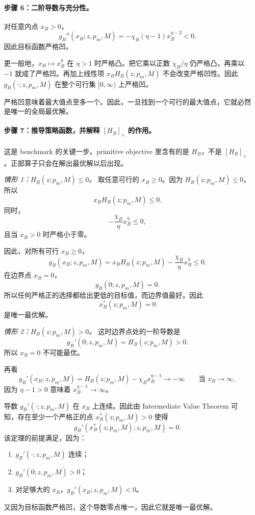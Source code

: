\paragraph{步骤 6：二阶导数与充分性。}
对任意内点 $x_B>0$，
\[
g_B''(x_B;z,p_m,M)=-\chi_B(\eta-1)x_B^{\eta-2}<0.
\]
因此目标函数严格凹。

更一般地，$x_B\mapsto x_B^\eta$ 在 $\eta>1$ 时严格凸。把它乘以正数 $\chi_B/\eta$ 仍严格凸，再乘以 $-1$ 就成了严格凹。再加上线性项 $x_BH_B(z;p_m,M)$ 不会改变严格凹性。因此 $g_B(\cdot;z,p_m,M)$ 在整个可行集 $[0,\infty)$ 上严格凹。

严格凹意味着最大值点至多一个。因此，一旦找到一个可行的最大值点，它就必然是唯一的全局最优解。

\paragraph{步骤 7：推导策略函数，并解释 $[H_B]_+$ 的作用。}
这是 benchmark 的关键一步。primitive objective 里含有的是 $H_B$，不是 $[H_B]_+$。正部算子只会在解出最优解以后出现。

\textit{情形 1：$H_B(z;p_m,M)\le 0$。}
取任意可行的 $x_B\ge 0$。因为 $H_B(z;p_m,M)\le 0$，所以
\[
x_BH_B(z;p_m,M)\le 0.
\]
同时，
\[
-\frac{\chi_B}{\eta}x_B^\eta\le 0,
\]
且当 $x_B>0$ 时严格小于零。

因此，对所有可行 $x_B\ge 0$，
\[
g_B(x_B;z,p_m,M)=x_BH_B(z;p_m,M)-\frac{\chi_B}{\eta}x_B^\eta\le 0.
\]
在边界点 $x_B=0$，
\[
g_B(0;z,p_m,M)=0.
\]
所以任何严格正的选择都给出更低的目标值，而边界值最好。因此
\[
x_B^*(z;p_m,M)=0
\]
是唯一最优解。

\textit{情形 2：$H_B(z;p_m,M)>0$。}
这时边界点处的一阶导数是
\[
g_B'(0;z,p_m,M)=H_B(z;p_m,M)>0.
\]
所以 $x_B=0$ 不可能最优。

再看
\[
g_B'(x_B;z,p_m,M)=H_B(z;p_m,M)-\chi_Bx_B^{\eta-1}\to -\infty
\qquad\text{当 }x_B\to\infty,
\]
因为 $\eta-1>0$ 意味着 $x_B^{\eta-1}\to\infty$。

导数 $g_B'(\cdot;z,p_m,M)$ 在 $x_B$ 上连续。因此由 Intermediate Value Theorem 可知，存在至少一个严格正的点 $x_B^*(z;p_m,M)>0$ 使得
\[
g_B'(x_B^*(z;p_m,M);z,p_m,M)=0.
\]
该定理的前提满足，因为：
\begin{enumerate}
    \item $g_B'(\cdot;z,p_m,M)$ 连续；
    \item $g_B'(0;z,p_m,M)>0$；
    \item 对足够大的 $x_B$，$g_B'(x_B;z,p_m,M)<0$。
\end{enumerate}
又因为目标函数严格凹，这个导数零点唯一，因此它就是唯一最优解。

